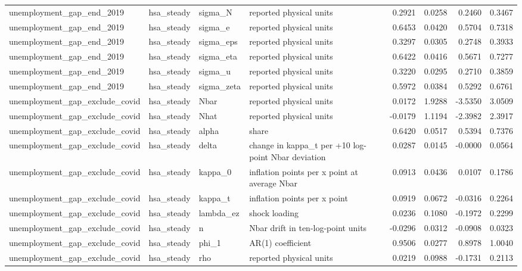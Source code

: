 \begin{tabular}{llllrrrr}
unemployment\_gap\_end\_2019 & hsa\_steady & sigma\_N & reported physical units & 0.2921 & 0.0258 & 0.2460 & 0.3467 \\
unemployment\_gap\_end\_2019 & hsa\_steady & sigma\_e & reported physical units & 0.6453 & 0.0420 & 0.5704 & 0.7318 \\
unemployment\_gap\_end\_2019 & hsa\_steady & sigma\_eps & reported physical units & 0.3297 & 0.0305 & 0.2748 & 0.3933 \\
unemployment\_gap\_end\_2019 & hsa\_steady & sigma\_eta & reported physical units & 0.6422 & 0.0416 & 0.5671 & 0.7277 \\
unemployment\_gap\_end\_2019 & hsa\_steady & sigma\_u & reported physical units & 0.3220 & 0.0295 & 0.2710 & 0.3859 \\
unemployment\_gap\_end\_2019 & hsa\_steady & sigma\_zeta & reported physical units & 0.5972 & 0.0384 & 0.5292 & 0.6761 \\
unemployment\_gap\_exclude\_covid & hsa\_steady & Nbar & reported physical units & 0.0172 & 1.9288 & -3.5350 & 3.0509 \\
unemployment\_gap\_exclude\_covid & hsa\_steady & Nhat & reported physical units & -0.0179 & 1.1194 & -2.3982 & 2.3917 \\
unemployment\_gap\_exclude\_covid & hsa\_steady & alpha & share & 0.6420 & 0.0517 & 0.5394 & 0.7376 \\
unemployment\_gap\_exclude\_covid & hsa\_steady & delta & change in kappa\_t per +10 log-point Nbar deviation & 0.0287 & 0.0145 & -0.0000 & 0.0564 \\
unemployment\_gap\_exclude\_covid & hsa\_steady & kappa\_0 & inflation points per x point at average Nbar & 0.0913 & 0.0436 & 0.0107 & 0.1786 \\
unemployment\_gap\_exclude\_covid & hsa\_steady & kappa\_t & inflation points per x point & 0.0919 & 0.0672 & -0.0316 & 0.2264 \\
unemployment\_gap\_exclude\_covid & hsa\_steady & lambda\_ez & shock loading & 0.0236 & 0.1080 & -0.1972 & 0.2299 \\
unemployment\_gap\_exclude\_covid & hsa\_steady & n & Nbar drift in ten-log-point units & -0.0296 & 0.0312 & -0.0908 & 0.0323 \\
unemployment\_gap\_exclude\_covid & hsa\_steady & phi\_1 & AR(1) coefficient & 0.9506 & 0.0277 & 0.8978 & 1.0040 \\
unemployment\_gap\_exclude\_covid & hsa\_steady & rho & reported physical units & 0.0219 & 0.0988 & -0.1731 & 0.2113 \\

\end{tabular}
